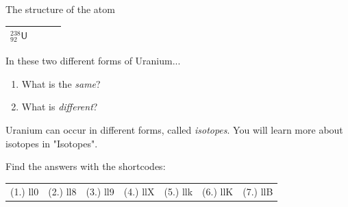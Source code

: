 \begin{exercises}{The structure of the atom}
\begin{enumerate}[noitemsep, label=\textbf{\arabic*}. ]
\begin{table}[H]
\begin{center}
\begin{tabular}{|l|l|l|l|}
        $_{92}^{238}\mathsf{U}$ &
         &
         &
     \\ \hline
    \end{tabular}
      \end{center}
\end{table}
    \par
In these two different forms of Uranium...
\label{m38745*id257277}\begin{enumerate}[noitemsep, label=\textbf{\alph*}. ] 
            \label{m38745*uid38}\item What is the \textsl{same}?
\label{m38745*uid39}\item What is \textsl{different}?
\end{enumerate}
Uranium can occur in different forms, called \textsl{isotopes}. You will learn more about isotopes in "Isotopes".\newline
\end{enumerate}
  \label{m38745**end}
\par {} Find the answers with the shortcodes:
 \par \begin{tabular}[h]{cccccc}
 (1.) ll0  &  (2.) ll8  &  (3.) ll9  &  (4.) llX  &  (5.) llk  &  (6.) llK  &  (7.) llB  & \end{tabular}
\end{exercises}
